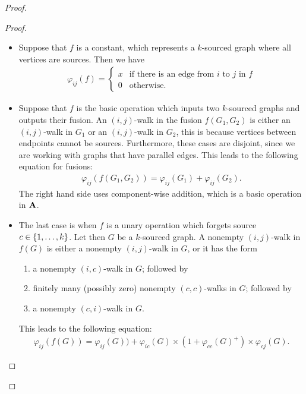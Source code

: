 \begin{proof}
\begin{proof}
            \begin{itemize}
                \item Suppose that $f$ is a constant, which represents a  $k$-sourced graph where all vertices are sources. Then we have 
                \begin{align*}
                \varphi_{ij}(f) = \begin{cases}
                    x & \text{if there is an edge from $i$ to $j$ in $f$}\\
                    0 & \text{otherwise.}
                \end{cases}
                \end{align*}
                \item Suppose that $f$ is the  basic operation which inputs two $k$-sourced graphs and outputs their fusion.  
                An $(i,j)$-walk in the fusion $f(G_1,G_2)$ is either an $(i,j)$-walk in $G_1$ or an $(i,j)$-walk in $G_2$, this is because vertices between endpoints cannot be sources. Furthermore, these cases are disjoint, since we are working with graphs that have parallel edges.
  		This leads to the following equation for fusions:
                \begin{align*}
					\varphi_{ij}(f(G_1, G_2)) = \varphi_{ij}(G_1) + \varphi_{ij}(G_2).
                \end{align*}
                The right hand side uses component-wise addition, which is a basic operation in $\mathbf{A}$.
                \item The last case is when $f$ is a unary operation which forgets  source $c \in \{1,\ldots,k\}$.  Let then $G$ be a $k$-sourced graph. A nonempty $(i,j)$-walk in $f(G)$ is either a nonempty $(i,j)$-walk in $G$, or it has the form
                \begin{enumerate}
                    \item a nonempty $(i,c)$-walk in $G$; followed by 
                    \item finitely many (possibly zero) nonempty  $(c,c)$-walks in $G$; followed by
                    \item a nonempty $(c,i)$-walk in $G$.
                \end{enumerate}
                This leads to the following equation:
                \begin{align*}
                \varphi_{ij}(f(G)) = \varphi_{ij}(G)) +  \varphi_{ic}(G) \times (1+ \varphi_{cc}(G)^+)  \times \varphi_{cj}(G).
                \end{align*}                
            \end{itemize}
        \end{proof}
        
\end{proof}

